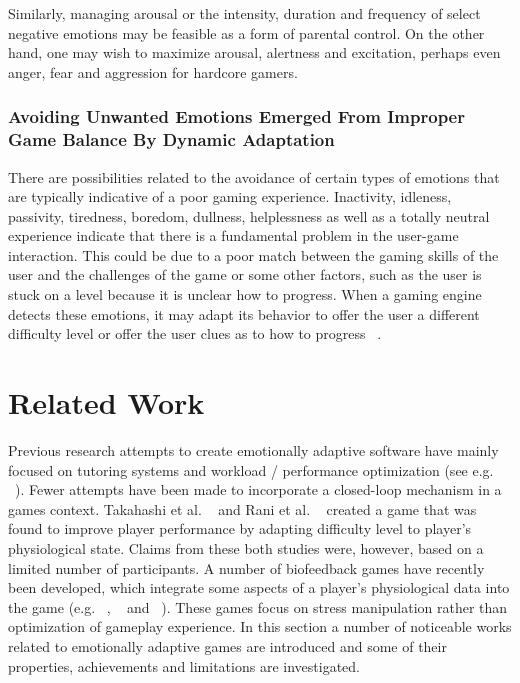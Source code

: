 Similarly, managing arousal or the intensity, duration and frequency of select negative emotions may be feasible as a form of parental control. On the other hand, one may wish to maximize arousal, alertness and excitation, perhaps even anger, fear and aggression for hardcore gamers.

\subsubsection{Avoiding Unwanted Emotions Emerged From Improper Game Balance By Dynamic Adaptation} There are possibilities related to the avoidance of certain types of emotions that are typically indicative of a poor gaming experience. Inactivity, idleness, passivity, tiredness, boredom, dullness, helplessness as well as a totally neutral experience indicate that there is a fundamental problem in the user-game interaction. This could be due to a poor match between the gaming skills of the user and the challenges of the game or some other factors, such as the user is stuck on a level because it is unclear how to progress. When a gaming engine detects these emotions, it may adapt its behavior to offer the user a different difficulty level or offer the user clues as to how to progress ~\cite{saari2005emotional}.

\section{Related Work}

Previous research attempts to create emotionally adaptive software have mainly focused on tutoring systems and workload / performance optimization (see e.g. ~\cite{schaefer2008usability}). Fewer attempts have been made to incorporate a closed-loop mechanism in a games context. Takahashi et al. ~\cite{takahashi1994experimental} and Rani et al. ~\cite{rani2005maintaining} created a game that was found to improve player performance by adapting difficulty level to player's physiological state. Claims from these both studies were, however, based on a limited number of participants. A number of biofeedback games have recently been developed, which integrate some aspects of a player's physiological data into the game (e.g. ~\cite{bell2003journey}, ~\cite{bersak2001intelligent} and ~\cite{xiang2013dynamic}). These games focus on stress manipulation rather than optimization of gameplay experience. In this section a number of noticeable works related to emotionally adaptive games are introduced and some of their properties, achievements and limitations are investigated.

